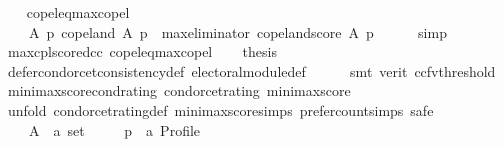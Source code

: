 \begin{isabellebody}
\ \ \isamarkupfalse%
\ copel{\isacharunderscore}{\kern0pt}eq{\isacharunderscore}{\kern0pt}max{\isacharunderscore}{\kern0pt}copel{\isacharcolon}{\kern0pt}\isanewline
\ \ \ \ {\isachardoublequoteopen}{\isasymAnd}A\ p{\isachardot}{\kern0pt}\ {\isacharparenleft}{\kern0pt}copeland\ A\ p\ {\isasymequiv}\ max{\isacharunderscore}{\kern0pt}eliminator\ copeland{\isacharunderscore}{\kern0pt}score\ A\ p{\isacharparenright}{\kern0pt}{\isachardoublequoteclose}\isanewline
\ \ \ \ \isamarkupfalse%
\ simp\isanewline
\ \ \isamarkupfalse%
\ max{\isacharunderscore}{\kern0pt}cplscore{\isacharunderscore}{\kern0pt}dcc\ copel{\isacharunderscore}{\kern0pt}eq{\isacharunderscore}{\kern0pt}max{\isacharunderscore}{\kern0pt}copel\isanewline
\ \ \isamarkupfalse%
\ {\isacharquery}{\kern0pt}thesis\isanewline
\ \ \ \ \isamarkupfalse%
\ defer{\isacharunderscore}{\kern0pt}condorcet{\isacharunderscore}{\kern0pt}consistency{\isacharunderscore}{\kern0pt}def\ electoral{\isacharunderscore}{\kern0pt}module{\isacharunderscore}{\kern0pt}def\isanewline
\ \ \ \ \isamarkupfalse%
\ {\isacharparenleft}{\kern0pt}smt\ {\isacharparenleft}{\kern0pt}verit{\isacharcomma}{\kern0pt}\ ccfv{\isacharunderscore}{\kern0pt}threshold{\isacharparenright}{\kern0pt}{\isacharparenright}{\kern0pt}\isanewline
{}\isamarkupfalse%
%
\endisatagproof
{\isafoldproof}%
%
\isadelimproof
\isanewline
%
\endisadelimproof
\isanewline
{}\isamarkupfalse%
\ minimax{\isacharunderscore}{\kern0pt}score{\isacharunderscore}{\kern0pt}cond{\isacharunderscore}{\kern0pt}rating{\isacharcolon}{\kern0pt}\ {\isachardoublequoteopen}condorcet{\isacharunderscore}{\kern0pt}rating\ minimax{\isacharunderscore}{\kern0pt}score{\isachardoublequoteclose}\isanewline
%
\isadelimproof
%
\endisadelimproof
%
\isatagproof
{}\isamarkupfalse%
\ {\isacharparenleft}{\kern0pt}unfold\ condorcet{\isacharunderscore}{\kern0pt}rating{\isacharunderscore}{\kern0pt}def\ minimax{\isacharunderscore}{\kern0pt}score{\isachardot}{\kern0pt}simps\ prefer{\isacharunderscore}{\kern0pt}count{\isachardot}{\kern0pt}simps{\isacharcomma}{\kern0pt}\ safe{\isacharparenright}{\kern0pt}\isanewline
\ \ \isamarkupfalse%
\isanewline
\ \ \ \ A\ {\isacharcolon}{\kern0pt}{\isacharcolon}{\kern0pt}\ {\isachardoublequoteopen}{\isacharprime}{\kern0pt}a\ set{\isachardoublequoteclose}\ \isanewline
\ \ \ \ p\ {\isacharcolon}{\kern0pt}{\isacharcolon}{\kern0pt}\ {\isachardoublequoteopen}{\isacharprime}{\kern0pt}a\ Profile{\isachardoublequoteclose}\ \isanewline

\end{isabellebody}
